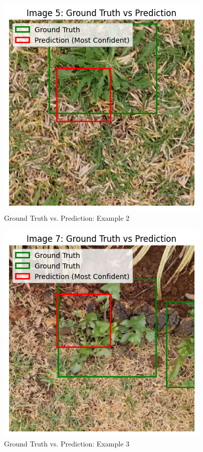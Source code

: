 \documentclass[conference]{IEEEtran}
\begin{document}
\begin{figure}[H]
    \centering
    \includegraphics[width=\columnwidth]{result2.png}
    \caption{Ground Truth vs. Prediction: Example 2}
    \label{fig:result2}
\end{figure}

\begin{figure}[H]
    \centering
    \includegraphics[width=\columnwidth]{result3.png}
    \caption{Ground Truth vs. Prediction: Example 3}
    \label{fig:result3}
\end{figure}
\end{document}
